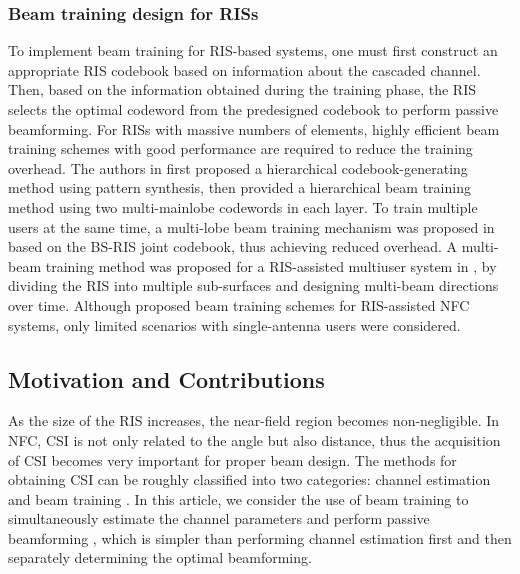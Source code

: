\documentclass[lettersize, journal]{IEEEtran}
\begin{document}
\subsubsection{Beam training design for RISs} 

To implement beam training for RIS-based systems, one must first construct an appropriate RIS codebook based on information about the cascaded channel.
Then, based on the information obtained during the training phase, the RIS selects the optimal codeword from the predesigned codebook to perform passive beamforming.
For RISs with massive numbers of elements, highly efficient beam training schemes with good performance are required to reduce the training overhead. 
The authors in {\cite{TCOMM.2023.3251374}} first proposed a hierarchical codebook-generating method using pattern synthesis, then provided a hierarchical
beam training method using two multi-mainlobe codewords in each layer.
To train multiple users at the same time, a multi-lobe beam training mechanism was proposed in {\cite{TWC.2022.3174849}} based on the BS-RIS joint codebook, thus achieving reduced overhead. 
A multi-beam training method was proposed for a RIS-assisted multiuser system in {\cite{LWC.2020.3005980}}, by dividing the RIS into multiple sub-surfaces and designing multi-beam directions over time. 
Although  {\cite{TCOMM.2023.3278728, TGCN.2023.3259579, JCC.2022.06.015}} proposed beam training schemes for RIS-assisted NFC systems, only limited scenarios with single-antenna users were considered. 


\subsection{Motivation and Contributions}

As the size of the RIS increases, the near-field region becomes non-negligible.
In NFC, CSI is not only related to the angle but also distance, thus the acquisition of CSI becomes very important for proper beam design.
The methods for obtaining CSI can be roughly classified into two categories: channel estimation and beam training {\cite{JCC.2022.06.015}}.
In this article, we consider the use of beam training to simultaneously estimate the channel parameters and perform passive beamforming {\cite{TWC.2017.2686402}}, which is simpler than performing channel estimation first and then separately determining the optimal beamforming. 
\end{document}
